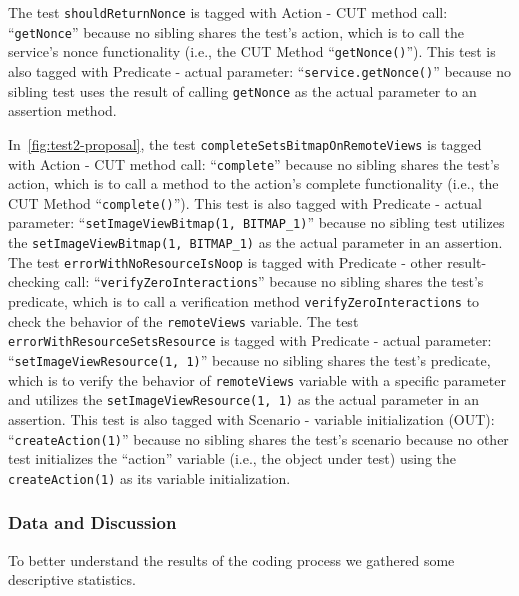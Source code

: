 The test \texttt{shouldReturnNonce} is tagged with Action - CUT method call: \enquote{\texttt{getNonce}} because no sibling shares the test’s action, which is to call the service’s nonce functionality (i.e., the CUT Method \enquote{\texttt{getNonce()}}).
%
This test is also tagged with Predicate - actual parameter: \enquote{\texttt{service.getNonce()}} because no sibling test uses the result of calling \texttt{getNonce} as the actual parameter to an assertion method.


In~\cref{fig:test2-proposal}, the test \texttt{completeSetsBitmapOnRemoteViews} is tagged with Action - CUT method call: \enquote{\texttt{complete}} because no sibling shares the test’s action, which is to call a method to the action’s complete functionality (i.e., the CUT Method \enquote{\texttt{complete()}}).
%
This test is also tagged with Predicate - actual parameter: \enquote{\texttt{setImageViewBitmap(1, BITMAP\_1)}} because no sibling test utilizes the \texttt{setImageViewBitmap(1, BITMAP\_1)} as the actual parameter in an assertion.
%
The test \texttt{errorWithNoResourceIsNoop} is tagged with Predicate - other result-checking call: \enquote{\texttt{verifyZeroInteractions}} because no sibling shares the test’s predicate, which is to call a verification method \texttt{verifyZeroInteractions} to check the behavior of the \texttt{remoteViews} variable.
%
The test \texttt{errorWithResourceSetsResource} is tagged with Predicate - actual parameter: \enquote{\texttt{setImageViewResource(1, 1)}} because no sibling shares the test’s predicate, which is to verify the behavior of \texttt{remoteViews} variable with a specific parameter and utilizes the \texttt{setImageViewResource(1, 1)} as the actual parameter in an assertion.
%
This test is also tagged with Scenario - variable initialization (OUT): \enquote{\texttt{createAction(1)}} because no sibling shares the test’s scenario because no other test initializes the \enquote{action} variable (i.e., the object under test) using the \texttt{createAction(1)} as its variable initialization.

\subsubsection{Data and Discussion}

To better understand the results of the coding process we gathered some descriptive statistics.

